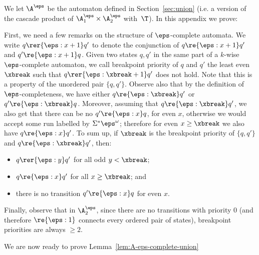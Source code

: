 We let $\A^\eps$ be the automaton defined in Section~\ref{sec:union} (i.e. a version of the cascade product of $\A_{1}^\eps \times \A_{2}^\eps$ with~$\T$). In this appendix we prove:
\AepsCompleteUnion*

First, we need a few remarks on the structure of $\eps$-complete automata.
We write $q \rer{\eps:x+1} q'$ to denote the conjunction of $q \re{\eps:x+1} q' $ and $q' \re{\eps:x+1} q$.
Given two states $q,q'$ in the same part of a $k$-wise $\eps$-complete automaton, we call breakpoint priority of $q$ and $q'$ the least even $\xbreak$ such that $q \rer{\eps:\xbreak+1} q'$ does not hold.
Note that this is a property of the unordered pair $\{q,q'\}$.
Observe also that by the definition of $\eps$-completeness, we have either $q \re{\eps:\xbreak} q'$ or $q' \re{\eps:\xbreak} q$. %
Moreover, assuming that $q \re{\eps:\xbreak} q'$, we also get that there can be no $q' \re{\eps:x} q$, for even $x$, otherwise we would accept some run labelled by $\Sigma^* \eps^\omega$; therefore for even $x \geq \xbreak$ we also have $q \re{\eps:x} q'$.
To sum up, if $\xbreak$ is the breakpoint priority of $\{q,q'\}$ and $q \re{\eps:\xbreak} q'$, then: 
\begin{itemize}
    \item $q\rer{\eps:y} q'$ for all odd $y<\xbreak$;
    \item $q\re{\eps:x} q'$ for all $x\geq \xbreak$; and
    \item there is no transition $q'\re{\eps:x} q$ for even $x$.
\end{itemize}
Finally, observe that in $\A_2^\eps$, since there are no transitions with priority $0$ (and therefore $\re{\eps:1}$ connects every ordered pair of states), breakpoint priorities are always $\geq 2$.


We are now ready to prove Lemma~\ref{lem:A-eps-complete-union}

